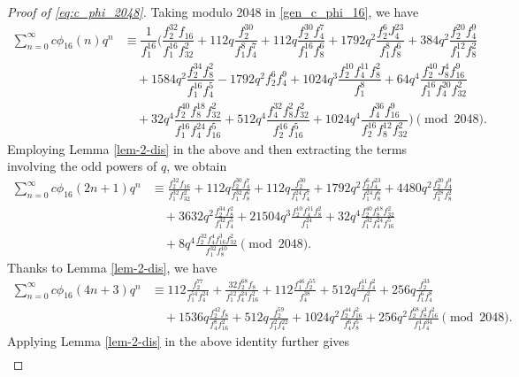 \documentclass[12pt]{article}
\numberwithin{equation}{section}
\theoremstyle{plain}
\numberwithin{theorem}{section}
\theoremstyle{definition}
\theoremstyle{remark}
\begin{document}
\begin{proof}[Proof of \eqref{eq:c_phi_2048}]
    
Taking modulo 2048 in \eqref{gen_c_phi_16}, we have
\begin{align*}
    \sum_{n=0}^{\infty}c\phi_{16}(n)q^n&\equiv\dfrac{1}{f^{16}_{1}} \bigg (\dfrac{f_2^{32}f_{16}}{f_1^{16}f_{32}^2} +112q\dfrac{f_2^{30}}{f_1^8f_4^7} +112q\dfrac{f_2^{30}f_4^7}{f_1^{16}f_8^6} +1792q^2\dfrac{f_2^6J_4^{23}}{f_1^8f_8^6}+384q^2\dfrac{f_2^{20}f_4^9}{f_1^{12}f_8^2}\\&\quad+1584q^2\dfrac{f_2^{34}f_8^2}{f_1^{16}f_4^5}-1792q^2f_2^6f_4^9+1024q^3\dfrac{f_2^{10}f_4^{11}f_8^2}{f_1^8}+64q^4\dfrac{f_2^{40}J_8^4f_{16}^9}{f_1^{16}f_4^{20}f_{32}^2} \\&\quad+32q^4\dfrac{f_2^{40}f_8^{18}f_{32}^2}{f_1^{16}f_4^{24}f_{16}^5}+512q^4\dfrac{f_4^{32}f_8^2f_{32}^2}{f_2^{16}f_{16}^5} +1024q^4\dfrac{f_4^{36}f_{16}^9}{f_2^{16}f_8^{12}f_{32}^2}\bigg)\pmod{2048}.
\end{align*}
Employing Lemma \ref{lem-2-dis} in the above and then extracting the terms involving the odd powers of $q$, we obtain
	\begin{align*}
		\sum_{n=0}^{\infty}c\phi_{16}(2n+1)q^n&\equiv\frac{f_2^{32}f_{16} }{f_1^{32} f_{32}^2}+112q\frac{f_2^{30} f_4^7}{f_1^{32} f_8^6}+112q\frac{ f_2^{30}}{f_1^{24} f_4^7}+1792q^2\frac{ f_2^6 f_4^{23}}{f_1^{24} f_8^6}+4480q^2\frac{f_2^{20} f_4^9}{f_1^{28} f_8^2}\\
        &\quad +3632q^2\frac{f_2^{34} f_8^2}{f_1^{32} f_4^5}+21504q^3\frac{ f_2^{10} f_4^{11} f_8^2}{f_1^{24}} +32q^4\frac{f_2^{40} f_8^{18} f_{32}^2}{f_1^{32} f_4^{24} f_{16}^5}\\
        &\quad +8q^4\frac{f_2^{32} f_4^4 f_{16}^3 f_{32}^2 }{f_1^{32} f_8^{10}}\pmod{2048}.
	\end{align*}
	Thanks to Lemma \ref{lem-2-dis}, we have
	\begin{align*}
			\sum_{n=0}^{\infty}c\phi_{16}(4n+3)q^n&\equiv 112\frac{ f_2^{77}}{f_1^{54} f_4^{24}}+\frac{32 f_2^{68}f_8 }{f_1^{12} f_4^{24} f_{16}^2}+112\frac{f_1^{46} f_2^{55}}{f_4^{38}}+512q\frac{f_2^{11} f_4^2}{f_1^2}+256q\frac{ f_2^{33}}{f_1^6 f_4^8}\\
            &\quad +1536q\frac{ f_2^{42}f_8 }{f_4^8 f_{16}^2}+512q\frac{ f_2^{59} }{f_1^2 f_4^{22}}+1024q^2\frac{ f_2^{44}f_{16}^2  }{f_4^6 f_8^5}+256q^2\frac{ f_2^{68}f_8^3 f_{16}^2  }{f_1^4 f_4^{34}}\pmod{2048}.
	\end{align*}
   Applying Lemma \ref{lem-2-dis} in the above identity further gives
	\begin{align*}

\end{align*}
\end{proof}
\end{document}
